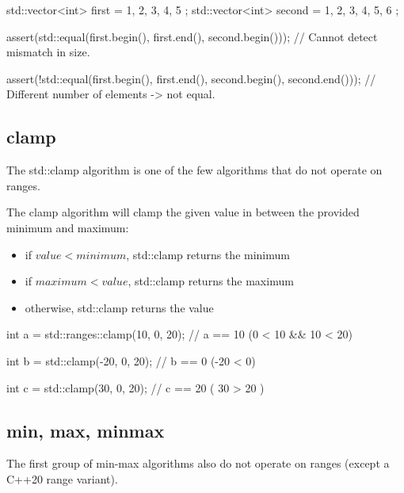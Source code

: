 \begin{box-note}
\begin{cppcode}
std::vector<int> first = { 1, 2, 3, 4, 5 };
std::vector<int> second = { 1, 2, 3, 4, 5, 6 };

assert(std::equal(first.begin(), first.end(), 
                  second.begin()));
// Cannot detect mismatch in size.

assert(!std::equal(first.begin(), first.end(), 
                   second.begin(), second.end()));
// Different number of elements -> not equal.
\end{cppcode}
\end{box-note}

\subsection{clamp}

The std::clamp algorithm is one of the few algorithms that do not operate on ranges.


The clamp algorithm will clamp the given value in between the provided minimum and maximum:

\begin{itemize}
    \item if $value < minimum$, std::clamp returns the minimum
    \item if $maximum < value$, std::clamp returns the maximum
    \item otherwise, std::clamp returns the value
\end{itemize}

\begin{box-note}
\begin{cppcode}
int a = std::ranges::clamp(10, 0, 20);
// a == 10 (0 < 10 && 10 < 20)

int b = std::clamp(-20, 0, 20);
// b == 0 (-20 < 0)

int c = std::clamp(30, 0, 20);
// c == 20 ( 30 > 20 )
\end{cppcode}
\end{box-note}

\subsection{min, max, minmax}

The first group of min-max algorithms also do not operate on ranges (except a C++20 range variant).

